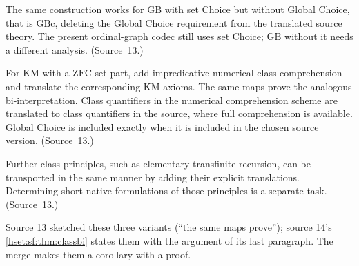 \documentclass[11pt,letterpaper]{article}
\theoremstyle{definition}
\theoremstyle{remark}
\newcommand{\ZFC}{\mathrm{ZFC}}
\newcommand{\GB}{\mathrm{GB}}
\newcommand{\GBc}{\mathrm{GBc}}
\newcommand{\KM}{\mathrm{KM}}
\begin{document}
The same construction works for $\GB$ with set Choice but without Global Choice,
that is $\GBc$, deleting the Global Choice requirement from the translated source
theory. The present ordinal-graph codec still uses set Choice; $\GB$ without it
needs a different analysis. (Source~13.)

For $\KM$ with a $\ZFC$ set part, add impredicative numerical class comprehension
and translate the corresponding $\KM$ axioms. The same maps prove the analogous
bi-interpretation. Class quantifiers in the numerical comprehension scheme are
translated to class quantifiers in the source, where full comprehension is
available. Global Choice is included exactly when it is included in the chosen
source version. (Source~13.)

Further class principles, such as elementary transfinite recursion, can be
transported in the same manner by adding their explicit translations. Determining
short native formulations of those principles is a separate task. (Source~13.)

Source 13 sketched these three variants (``the same maps prove''); source 14's
\cref{hset:sf:thm:classbi} states them with the argument of its last paragraph.
The merge makes them a corollary with a proof.
\end{document}
